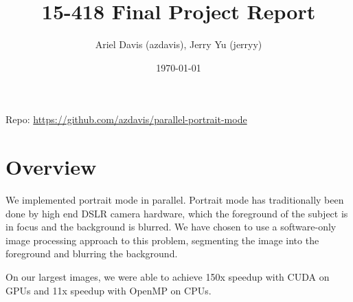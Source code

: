 \documentclass[12pt]{article}
\author{Ariel Davis (azdavis), Jerry Yu (jerryy)}
\date{\today}
\title{15-418 Final Project Report}
\begin{document}
\maketitle

Repo: \url{https://github.com/azdavis/parallel-portrait-mode}

\section{Overview}

We implemented portrait mode in parallel. Portrait mode has traditionally been
done by high end DSLR camera hardware, which the foreground of the subject is
in focus and the background is blurred. We have chosen to use a software-only
image processing approach to this problem, segmenting the image into the
foreground and blurring the background.

On our largest images, we were able to achieve 150x speedup with CUDA on GPUs
and 11x speedup with OpenMP on CPUs.
\end{document}
